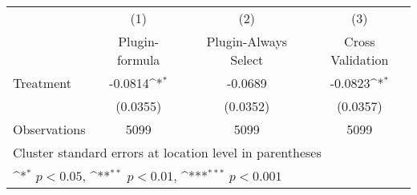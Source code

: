 {
\def\sym#1{\ifmmode^{#1}\else\(^{#1}\)\fi}
\begin{tabular}{l*{3}{c}}
\hline\hline
                    &\multicolumn{1}{c}{(1)}         &\multicolumn{1}{c}{(2)}         &\multicolumn{1}{c}{(3)}         \\
                   &\multicolumn{1}{c}{Plugin-formula}         &\multicolumn{1}{c}{Plugin-Always Select}         &\multicolumn{1}{c}{Cross Validation}         \\

\hline
Treatment           &     -0.0814\sym{*}  &     -0.0689         &     -0.0823\sym{*}  \\
                    &    (0.0355)         &    (0.0352)         &    (0.0357)         \\
\hline
Observations        &        5099         &        5099         &        5099         \\
\hline\hline
\multicolumn{4}{l}{\footnotesize Cluster standard errors at location level in parentheses}\\
\multicolumn{4}{l}{\footnotesize \sym{*} \(p<0.05\), \sym{**} \(p<0.01\), \sym{***} \(p<0.001\)}\\
\end{tabular}
}
